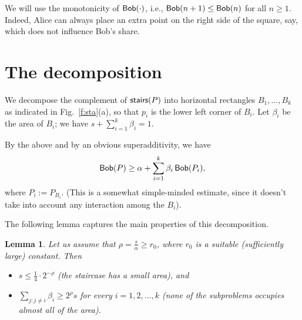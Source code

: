 \documentclass[11pt]{article}
\newtheorem{lemma}[theorem]{Lemma}
\DeclareMathOperator{\bob}{{\sf Bob}}
\DeclareMathOperator{\stairs}{{\sf stairs}}
\begin{document}
We will use the monotonicity of $\bob(\cdot)$, i.e.,
$\bob(n+1)\le\bob(n)$ for all $n\ge 1$.
Indeed, Alice can always place an extra point on the right side
of the square, say, which does not influence Bob's share.


\section{The decomposition} We decompose the complement of $\stairs(P)$
into horizontal rectangles $B_1,\ldots,B_k$ as indicated
in Fig.~\ref{f:sta}(a), so that $p_i$ is the lower left
corner of $B_i$. Let $\beta_i$ be the area of $B_i$;
we have $s+\sum_{i=1}^k\beta_i=1$.

By the above and by an obvious superadditivity, we have
\begin{equation}\label{e:decompose}
\bob(P)\ge \alpha+\sum_{i=1}^k \beta_i \bob(P_i),
\end{equation}
where $P_i:= P_{B_i}.$ (This is a somewhat simple-minded estimate, since it doesn't take
into account any interaction among the $B_i$).

The following lemma captures the main properties of this
decomposition.

\begin{lemma}\label{l:nobig}
Let us  assume that $\rho=\frac s\alpha\ge r_0$, where
$r_0$ is a suitable (sufficiently large) constant.
Then 
\begin{itemize}\item 
$s \le \frac 14 \cdot 2^{-\rho}$ (the staircase has a small area), and
\item 
$\sum_{j:j\ne i}\beta_i \ge  2^\rho s$ 
for every $i=1,2,\ldots,k$ (none of the subproblems
occupies almost all of the area).
\end{itemize}
\end{lemma}
\end{document}
